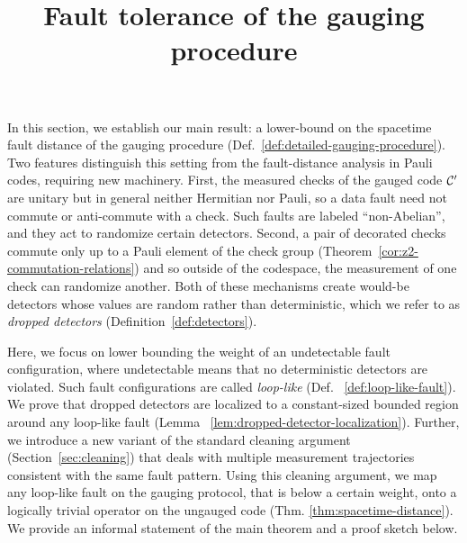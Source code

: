 \documentclass[11pt]{article}
\author{}
\title{Fault tolerance of the gauging procedure}
\begin{document}
    
    
    \maketitle

\fi

In this section, we establish our main result: a lower-bound on the spacetime fault distance of the gauging procedure (Def.~\ref{def:detailed-gauging-procedure}).
Two features distinguish this setting from the fault-distance analysis in Pauli codes, requiring new machinery. 
First, the measured checks of the gauged code $\mathcal{C}'$ are unitary but in general neither Hermitian nor Pauli, so a data fault need not commute or anti-commute with a check. Such faults are labeled ``non-Abelian'', and they act to randomize certain detectors. 
Second, a pair of decorated checks commute only up to a Pauli element of the check group (Theorem~\ref{cor:z2-commutation-relations}) and so outside of the codespace, the measurement of one check
can randomize another. 
Both of these mechanisms create would-be detectors whose values are 
random rather than deterministic, which we refer to as \emph{dropped detectors} 
(Definition~\ref{def:detectors}).

Here, we focus on lower bounding the weight of an undetectable fault configuration, where undetectable means that no deterministic detectors are violated. Such fault configurations are called \emph{loop-like} (Def. ~\ref{def:loop-like-fault}).
We prove that dropped detectors are localized to a constant-sized bounded region around any loop-like fault (Lemma ~\ref{lem:dropped-detector-localization}).
Further, we introduce a new variant of the standard cleaning argument (Section~\ref{sec:cleaning}) that deals with multiple measurement trajectories consistent with the same fault pattern. Using this cleaning argument, we map any loop-like fault on the gauging protocol, that is below a certain weight, onto a logically trivial operator on the ungauged code (Thm. \ref{thm:spacetime-distance}). We provide an informal statement of the main theorem and a proof sketch below.
\vspace{3pt}
\end{document}
